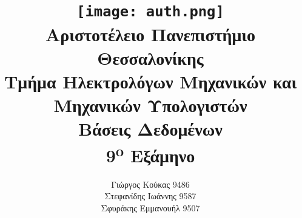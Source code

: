 \title{
  \texttt{[image: auth.png]}\\
  \large{Αριστοτέλειο Πανεπιστήμιο Θεσσαλονίκης}\\
  \large{Τμήμα Ηλεκτρολόγων Μηχανικών και Μηχανικών Υπολογιστών}\\
  \vspace{2cm}
  \LARGE{Βάσεις Δεδομένων}\\
  \vspace{0.5cm}
  \large{9\textsuperscript{o} Εξάμηνο}
  \vspace{3cm}
}

\author{
  Γιώργος Κούκας		9486\\
	Στεφανίδης Ιωάννης 9587\\
	Σφυράκης Εμμανουήλ 9507
	\vspace{3cm}
}
